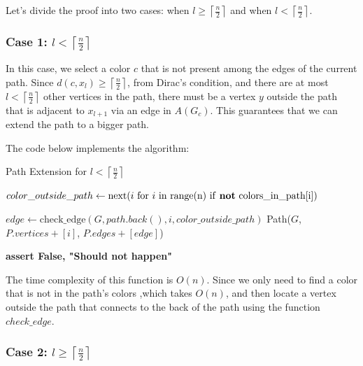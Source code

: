 Let's divide the proof into two cases: when \( l \geq \left \lceil \frac{n}{2} \right \rceil \) and when \( l < \left \lceil \frac{n}{2} \right \rceil \).

\subsubsection{Case 1: \( l < \left \lceil \frac{n}{2} \right \rceil \)}

In this case, we select a color \( c \) that is not present among 
the edges of the current path. Since 
\( d(c, x_{l}) \geq \left \lceil \frac{n}{2} \right \rceil \), from Dirac's condition, 
and there are at most 
\( l < \left \lceil \frac{n}{2} \right \rceil \)
other vertices in the path, there must be a vertex 
\( y \) 
outside the path that is adjacent to 
\( x_{l + 1} \) via an edge in \( A(G_c) \). 
This guarantees that we can extend the path to a bigger path.

The code below implements the algorithm:

\begin{algorithm}[H]
    \caption{Path Extension for \( l < \left \lceil \frac{n}{2} \right \rceil \)}
    \begin{algorithmic}[1]
        \State $color\_outside\_path \gets \text{next}(i \text{ for } i \text{ in range(n) if \textbf{not} colors\_in\_path[i]})$

                \State $edge \gets \text{check\_edge}(G, path.back(), i, color\_outside\_path)$
                    \State \Return Path($G$, $P.vertices + [i]$, $P.edges + [edge]$)
                \EndIf
            \EndIf
        \EndFor

        \State \textbf{assert False, "Should not happen"}
    \EndFunction
    \end{algorithmic}
\end{algorithm}

The time complexity of this function is \( O(n) \). Since we 
only need to find a color that is not in the path’s colors 
,which takes \( O(n) \), and then locate a vertex outside 
the path that connects to the back of the path using the 
function $check\_edge$.

\subsubsection{Case 2: \( l \geq \left \lceil \frac{n}{2} \right \rceil \)}

